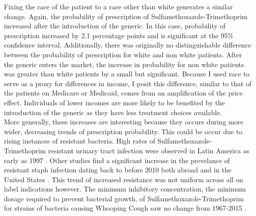 \indent Fixing the race of the patient to a race other than white generates a similar change. Again, the probability of prescription of Sulfamethoxazole-Trimethoprim increased after the introduction of the generic. In this case, probability of prescription increased by 2.1 percentage points and is significant at the 95\% confidence interval. Additionally, there was originally no distinguishable difference between the probability of prescription for white and non white patients. After the generic enters the market, the increase in probability for non white patients was greater than white patients by a small but significant. Because I used race to serve as a proxy for differences in income, I posit this difference, similar to that of the patients on Medicare or Medicaid, comes from an amplification of the price effect. Individuals of lower incomes are more likely to be benefited by the introduction of the generic as they have less treatment choices available.\\
\indent More generally, these increases are interesting because they occure during more wider, decreasing trends of prescription probability. This could be occur due to rising instances of resistant bacteria. High rates of Sulfamethoxazole-Trimethoprim resistant urinary tract infection were observed in Latin America as early as 1997 \cite{gales_urinary_2002}. Other studies find a significant increase in the prevelance of resistant staph infection dating back to before 2010 both abroad \cite{noauthor_resistance_nodate} and in the United States \cite{khamash_increasing_2019}. This trend of increased resistance was not uniform across all on label indications however. The minimum inhibitory concentration, the minimum dosage required to prevent bacterial growth, of Sulfamethoxazole-Trimethoprim for strains of bacteria causing Whooping Cough saw no change from 1967-2015 \cite{jakubu_trends_2017}.
